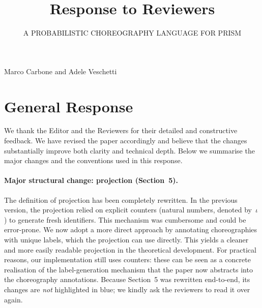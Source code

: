 \documentclass[11pt]{article}
\begin{document}
\title{Response to Reviewers}
\author{A PROBABILISTIC CHOREOGRAPHY LANGUAGE FOR PRISM}
\date{}
\maketitle
\vspace{-0.5\baselineskip}
\begin{center}
{\large Marco Carbone and Adele Veschetti}
\end{center}

\section*{General Response}

We thank the Editor and the Reviewers for their detailed and
constructive feedback. We have revised the paper accordingly and
believe that the changes substantially improve both clarity and
technical depth.  Below we summarise the major changes and the
conventions used in this response.

\paragraph{Major structural change: projection (Section~5).}
The definition of projection has been completely rewritten. In the
previous version, the projection relied on explicit counters (natural
numbers, denoted by~$\iota$) to generate fresh identifiers.  This
mechanism was cumbersome and could be error-prone. We now adopt a more
direct approach by annotating choreographies with unique labels, which
the projection can use directly. This yields a cleaner and more easily
readable projection in the theoretical development.  For practical
reasons, our implementation still uses counters: these can be seen as
a concrete realisation of the label-generation mechanism that the
paper now abstracts into the choreography annotations. Because
Section~5 was rewritten end-to-end, its changes are \emph{not}
highlighted in blue; we kindly ask the reviewers to read it over
again.
\end{document}
